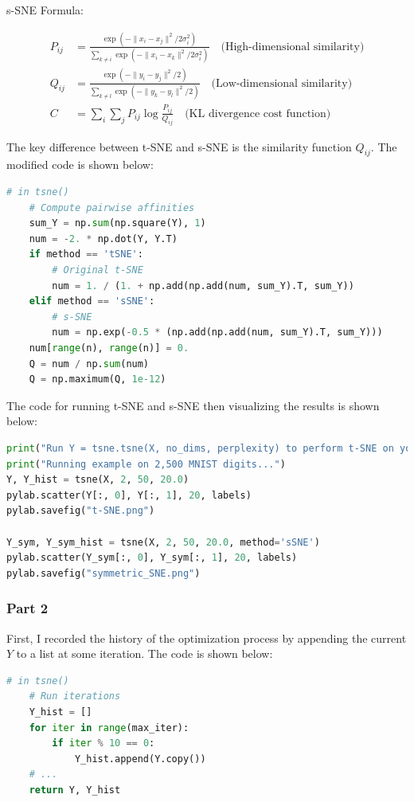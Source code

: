 \documentclass{homework}
\begin{document}
s-SNE Formula:

\begin{align*}
P_{ij} &= \frac{\exp(-\|x_i - x_j\|^2 / 2\sigma_i^2)}{\sum_{k \neq i} \exp(-\|x_i - x_k\|^2 / 2\sigma_i^2)} \quad \text{(High-dimensional similarity)} \\
Q_{ij} &= \frac{\exp(-\|y_i - y_j\|^2 / 2)}{\sum_{k \neq l} \exp(-\|y_k - y_l\|^2 / 2)} \quad \text{(Low-dimensional similarity)} \\
C &= \sum_{i} \sum_{j} P_{ij} \log \frac{P_{ij}}{Q_{ij}} \quad \text{(KL divergence cost function)}
\end{align*}

The key difference between t-SNE and s-SNE is the similarity function $Q_{ij}$. The modified code is shown below:

\begin{lstlisting}[language=Python]
# in tsne()
    # Compute pairwise affinities
    sum_Y = np.sum(np.square(Y), 1)
    num = -2. * np.dot(Y, Y.T)
    if method == 'tSNE':
        # Original t-SNE
        num = 1. / (1. + np.add(np.add(num, sum_Y).T, sum_Y))
    elif method == 'sSNE':
        # s-SNE
        num = np.exp(-0.5 * (np.add(np.add(num, sum_Y).T, sum_Y)))
    num[range(n), range(n)] = 0.
    Q = num / np.sum(num)
    Q = np.maximum(Q, 1e-12)
\end{lstlisting}

The code for running t-SNE and s-SNE then visualizing the results is shown below:

\begin{lstlisting}[language=Python]
print("Run Y = tsne.tsne(X, no_dims, perplexity) to perform t-SNE on your dataset.")
print("Running example on 2,500 MNIST digits...")
Y, Y_hist = tsne(X, 2, 50, 20.0)
pylab.scatter(Y[:, 0], Y[:, 1], 20, labels)
pylab.savefig("t-SNE.png")

Y_sym, Y_sym_hist = tsne(X, 2, 50, 20.0, method='sSNE')
pylab.scatter(Y_sym[:, 0], Y_sym[:, 1], 20, labels)
pylab.savefig("symmetric_SNE.png")
\end{lstlisting}

\subsubsection{Part 2}

First, I recorded the history of the optimization process by appending the current $Y$ to a list at some iteration. The code is shown below:

\begin{lstlisting}[language=Python]
# in tsne()
    # Run iterations
    Y_hist = []
    for iter in range(max_iter):
        if iter % 10 == 0:
            Y_hist.append(Y.copy())
    # ...
    return Y, Y_hist
\end{lstlisting}
\end{document}
